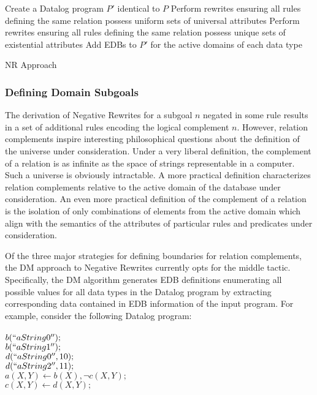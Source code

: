 \begin{algorithm} \label{DMalg}
\SetAlgoLined
{}
	Create a Datalog program $P'$ identical to $P$\;
	Perform rewrites ensuring all rules defining the same relation possess uniform sets of universal attributes\;
	Perform rewrites ensuring all rules defining the same relation possess unique sets of existential attributes\;
	Add EDBs to $P'$ for the active domains of each data type\;
 \caption{NR Approach}
\end{algorithm}

\subsubsection{Defining Domain Subgoals}\label{dom-subs}
The derivation of Negative Rewrites for a subgoal $n$ negated in some rule results in a set of additional rules encoding the logical complement $n$. However, relation complements inspire interesting philosophical questions about the definition of the universe under consideration. Under a very liberal definition, the complement of a relation is as infinite as the space of strings representable in a computer. Such a universe is obviously intractable. A more practical definition characterizes relation complements relative to the active domain of the database under consideration. An even more practical definition of the complement of a relation is the isolation of only combinations of elements from the active domain which align with the semantics of the attributes of particular rules and predicates under consideration.

Of the three major strategies for defining boundaries for relation complements, the DM approach to Negative Rewrites currently opts for the middle tactic. Specifically, the DM algorithm generates EDB definitions enumerating all possible values for all data types in the Datalog program by extracting corresponding data contained in EDB information of the input program. For example, consider the following Datalog program:
\\ \\
$b( ``aString0'' ) ;$ \\
$b( ``aString1'' ) ; $\\
$d( ``aString0'', 10 ) ; $\\
$d( ``aString2'', 11 ) ; $\\
$a( X, Y ) \leftarrow  b( X ), \neg c( X, Y ) ; $\\
$c( X, Y ) \leftarrow d( X, Y ) ; $
\\

